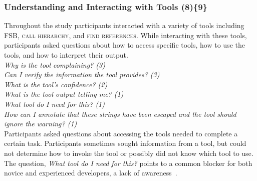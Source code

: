 \documentclass[10pt,journal,compsoc]{IEEEtran}
\begin{document}



\subsubsection{Understanding and Interacting with Tools (8)\{9\}}

\label{uit}

Throughout the study participants interacted with a variety of tools including FSB, \textsc{call hierarchy}, and \textsc{find references}. 
While interacting with these tools, participants asked questions about how to access specific tools, how to use the tools, and how to interpret their output. 
\\

\noindent\emph{Why is the tool complaining? (3)} \\
\emph{Can I verify the information the tool provides? (3)} \\
\emph{What is the tool's confidence? (2)} \\
\emph{What is the tool output telling me? (1)} \\
\emph{What tool do I need for this? (1)} \\ 
\emph{How can I annotate that these strings have been escaped and the tool should ignore the warning? (1)}
\\

Participants asked questions about accessing the tools needed to complete a certain task.
Participants sometimes sought information from a tool, but could not determine how to invoke the tool or possibly did not know which tool to use. 
The question, \emph{What tool do I need for this?} points to a common blocker for both novice and experienced developers, a lack of awareness~\cite{murphy-Hill2012fluency}.
\end{document}
